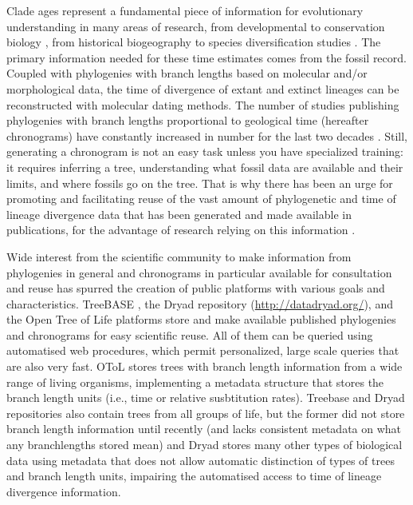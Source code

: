 \documentclass[11pt,]{article}
\begin{document}
Clade ages represent a fundamental piece of information for evolutionary
understanding in many areas of research, from developmental to
conservation biology \citep{Felsenstein1985a, Webb2000}, from historical
biogeography to species diversification studies
\citep{posadas2006historical, Morlon2014}. The primary information
needed for these time estimates comes from the fossil record. Coupled
with phylogenies with branch lengths based on molecular and/or
morphological data, the time of divergence of extant and extinct
lineages can be reconstructed with molecular dating methods. The number
of studies publishing phylogenies with branch lengths proportional to
geological time (hereafter chronograms) have constantly increased in
number for the last two decades \citep{Kumar2017}. Still, generating a
chronogram is not an easy task unless you have specialized training: it
requires inferring a tree, understanding what fossil data are available
and their limits, and where fossils go on the tree. That is why there
has been an urge for promoting and facilitating reuse of the vast amount
of phylogenetic and time of lineage divergence data that has been
generated and made available in publications, for the advantage of
research relying on this information
\citep{webb2005phylomatic, Stoltzfus2013}.

Wide interest from the scientific community to make information from
phylogenies in general and chronograms in particular available for
consultation and reuse has spurred the creation of public platforms with
various goals and characteristics. TreeBASE
\citep{morell1996roots, Piel2002}, the Dryad repository
(\url{http://datadryad.org/}), and the Open Tree of Life
\citep[OToL;][]{Hinchliff2015} platforms store and make available
published phylogenies and chronograms for easy scientific reuse. All of
them can be queried using automatised web procedures, which permit
personalized, large scale queries that are also very fast. OToL stores
trees with branch length information from a wide range of living
organisms, implementing a metadata structure that stores the branch
length units (i.e., time or relative susbtitution rates). Treebase and
Dryad repositories also contain trees from all groups of life, but the
former did not store branch length information until recently (and lacks
consistent metadata on what any branchlengths stored mean) and Dryad
stores many other types of biological data using metadata that does not
allow automatic distinction of types of trees and branch length units,
impairing the automatised access to time of lineage divergence
information.
\end{document}
